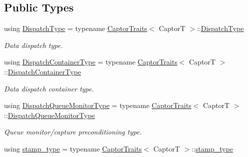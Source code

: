 \subsection*{Public Types}
\begin{DoxyCompactItemize}
\item 
\mbox{\label{classflow_1_1_captor_interface_ae1eafeb6cd50f4a50843b963c232720a}} 
using \hyperlink{classflow_1_1_captor_interface_ae1eafeb6cd50f4a50843b963c232720a}{Dispatch\+Type} = typename \hyperlink{structflow_1_1_captor_traits}{Captor\+Traits}$<$ CaptorT $>$\+::\hyperlink{classflow_1_1_captor_interface_ae1eafeb6cd50f4a50843b963c232720a}{Dispatch\+Type}
\begin{DoxyCompactList}\small\item\em Data dispatch type. \end{DoxyCompactList}\item 
\mbox{\label{classflow_1_1_captor_interface_a887171bf3b12d8232922a81844ea9a7d}} 
using \hyperlink{classflow_1_1_captor_interface_a887171bf3b12d8232922a81844ea9a7d}{Dispatch\+Container\+Type} = typename \hyperlink{structflow_1_1_captor_traits}{Captor\+Traits}$<$ CaptorT $>$\+::\hyperlink{classflow_1_1_captor_interface_a887171bf3b12d8232922a81844ea9a7d}{Dispatch\+Container\+Type}
\begin{DoxyCompactList}\small\item\em Data dispatch container type. \end{DoxyCompactList}\item 
\mbox{\label{classflow_1_1_captor_interface_a6624ec49c575e3a4c2730be405afe179}} 
using \hyperlink{classflow_1_1_captor_interface_a6624ec49c575e3a4c2730be405afe179}{Dispatch\+Queue\+Monitor\+Type} = typename \hyperlink{structflow_1_1_captor_traits}{Captor\+Traits}$<$ CaptorT $>$\+::\hyperlink{classflow_1_1_captor_interface_a6624ec49c575e3a4c2730be405afe179}{Dispatch\+Queue\+Monitor\+Type}
\begin{DoxyCompactList}\small\item\em Queue monitor/capture preconditioning type. \end{DoxyCompactList}\item 
\mbox{\label{classflow_1_1_captor_interface_a2b87d20d17e8d1437941bd98fe514bc8}} 
using \hyperlink{classflow_1_1_captor_interface_a2b87d20d17e8d1437941bd98fe514bc8}{stamp\+\_\+type} = typename \hyperlink{structflow_1_1_captor_traits}{Captor\+Traits}$<$ CaptorT $>$\+::\hyperlink{classflow_1_1_captor_interface_a2b87d20d17e8d1437941bd98fe514bc8}{stamp\+\_\+type}

\end{DoxyCompactItemize}
